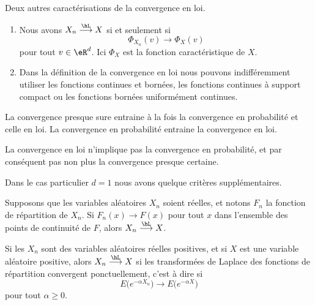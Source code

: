 \begin{proposition}     \label{PrpopCaractCvL}
    Deux autres caractérisations de la convergence en loi.
    \begin{enumerate}
        \item
            Nous avons \( X_n\stackrel{\hL}{\longrightarrow}X\) si et seulement si
            \begin{equation}
                \Phi_{X_n}(v)\to\Phi_X(v)
            \end{equation}
            pour tout \( v\in\eR^d\). Ici \( \Phi_X\) est la fonction caractéristique de \( X\).
        \item
            Dans la définition de la convergence en loi nous pouvons indifféremment utiliser les fonctions continues et bornées, les fonctions continues à support compact ou les fonctions bornées uniformément continues.
    \end{enumerate}
\end{proposition}

\begin{proposition}
    La convergence presque sure entraine à la fois la convergence en probabilité et celle en loi. La convergence en probabilité entraine la convergence en loi.
\end{proposition}
La convergence en loi n'implique pas la convergence en probabilité, et par conséquent pas non plus la convergence presque certaine.

Dans le cas particulier \( d=1\) nous avons quelque critères supplémentaires. 

\begin{proposition}
    Supposons que les variables aléatoires \( X_n\) soient réelles, et notons \( F_n\) la fonction de répartition de \( X_n\). Si \( F_n(x)\to F(x)\) pour tout \( x\) dans l'ensemble des points de continuité de \( F\), alors \( X_n\stackrel{\hL}{\longrightarrow}X\).
\end{proposition}

\begin{proposition}
    Si les \( X_n\) sont des variables aléatoires réelles positives, et si \( X\) est une variable aléatoire positive, alors \( X_n\stackrel{\hL}{\longrightarrow}X\) si les transformées de Laplace des fonctions de répartition convergent ponctuellement, c'est à dire si
    \begin{equation}
        E\big(  e^{-\alpha X_n} \big)\to E\big(  e^{-\alpha X} \big)
    \end{equation}
    pour tout \( \alpha\geq 0\).
\end{proposition}

